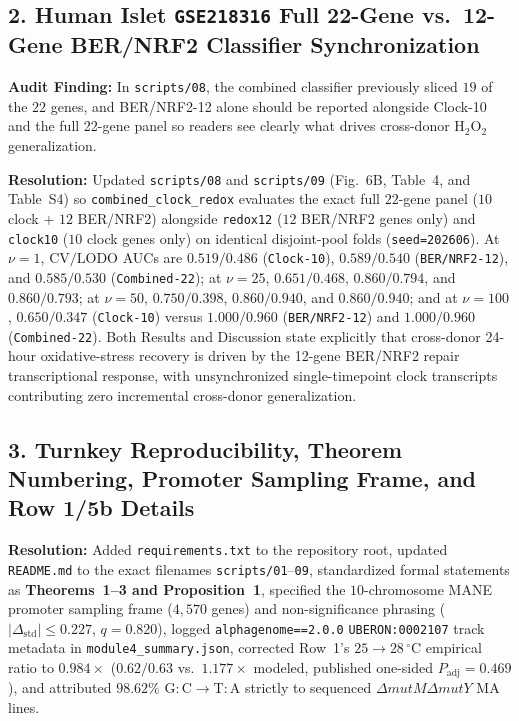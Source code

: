 \documentclass[10pt,letterpaper]{article}
\begin{document}
\subsection*{2. Human Islet \texttt{GSE218316} Full 22-Gene vs.\ 12-Gene BER/NRF2 Classifier Synchronization}
\textbf{Audit Finding:} In \texttt{scripts/08}, the combined classifier previously sliced $19$ of the $22$ genes, and BER/NRF2-12 alone should be reported alongside Clock-10 and the full 22-gene panel so readers see clearly what drives cross-donor $\mathrm{H_2O_2}$ generalization.

\medskip\noindent\textbf{Resolution:} Updated \texttt{scripts/08} and \texttt{scripts/09} (Fig.~6B, Table~4, and Table~S4) so \texttt{combined\_clock\_redox} evaluates the exact full $22$-gene panel ($10$ clock + $12$ BER/NRF2) alongside \texttt{redox12} ($12$ BER/NRF2 genes only) and \texttt{clock10} ($10$ clock genes only) on identical disjoint-pool folds (\texttt{seed=202606}). At $\nu = 1$, $\mathrm{CV}/\mathrm{LODO}$ AUCs are $0.519/0.486$ (\texttt{Clock-10}), $0.589/0.540$ (\texttt{BER/NRF2-12}), and $0.585/0.530$ (\texttt{Combined-22}); at $\nu = 25$, $0.651/0.468$, $0.860/0.794$, and $0.860/0.793$; at $\nu = 50$, $0.750/0.398$, $0.860/0.940$, and $0.860/0.940$; and at $\nu = 100$, $0.650/0.347$ (\texttt{Clock-10}) versus $1.000/0.960$ (\texttt{BER/NRF2-12}) and $1.000/0.960$ (\texttt{Combined-22}). Both Results and Discussion state explicitly that cross-donor 24-hour oxidative-stress recovery is driven by the 12-gene BER/NRF2 repair transcriptional response, with unsynchronized single-timepoint clock transcripts contributing zero incremental cross-donor generalization.

\subsection*{3. Turnkey Reproducibility, Theorem Numbering, Promoter Sampling Frame, and Row 1/5b Details}
\textbf{Resolution:} Added \texttt{requirements.txt} to the repository root, updated \texttt{README.md} to the exact filenames \texttt{scripts/01}--\texttt{09}, standardized formal statements as \textbf{Theorems~1--3 and Proposition~1}, specified the $10$-chromosome MANE promoter sampling frame ($4{,}570$ genes) and non-significance phrasing ($|\Delta_{\mathrm{std}}| \le 0.227$, $q = 0.820$), logged \texttt{alphagenome==2.0.0} \texttt{UBERON:0002107} track metadata in \texttt{module4\_summary.json}, corrected Row~1's $25 \to 28\,^\circ\mathrm{C}$ empirical ratio to $0.984\times$ ($0.62/0.63$ vs.\ $1.177\times$ modeled, published one-sided $P_{\mathrm{adj}} = 0.469$), and attributed $98.62\%$ $\mathrm{G{:}C \to T{:}A}$ strictly to sequenced $\Delta\textit{mutM}\Delta\textit{mutY}$ MA lines.
\end{document}

